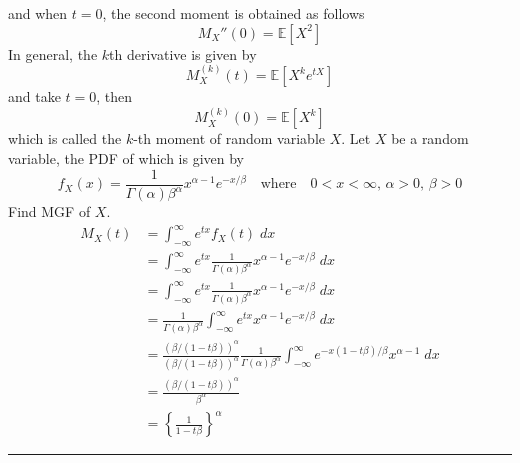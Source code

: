\documentclass[twoside]{article}
\makeatletter
\theoremstyle{definition}
\theoremstyle{remark}
\theoremstyle{remark}
\newenvironment{example}
 {\patchcmd{\@thm}{\trivlist}{\list{}{\leftmargin=3em \rightmargin=3em}}{}{}%
  \vspace*{10\p@}
  \innerexample\pushQED{\hfill\ensuremath{\Diamond}}}
 {\popQED\endinnerexample}
\newenvironment{sol}{{\bf Solution:}}{\hfill\rule{2mm}{2mm}}
\makeatother
\begin{document}
and when $t=0$, the second moment is obtained as follows
\begin{equation}
  M_X''(0) = \mathbb{E}[X^2]
\end{equation}
In general, the $k$th derivative is given by
\begin{equation}
  M_X^{(k)}(t) = \mathbb{E}[X^k{e^{tX}}]
\end{equation}
and take $t=0$, then
\begin{equation}
  M_X^{(k)}(0) = \mathbb{E}[X^k]
\end{equation}
which is called the $k$-th moment of random variable $X$.
\begin{example}
  Let $X$ be a random variable, the PDF of which is given by
  \begin{equation*}
    f_X(x) = \frac{1}{\Gamma(\alpha)\beta^{\alpha}} x^{\alpha-1}e^{-x/\beta}
    \quad \textrm{where} \quad 0 < x < \infty,\, \alpha>0,\, \beta>0
  \end{equation*}
  Find MGF of $X$. \\
  \begin{sol}
    \begin{equation*}
      \begin{split}
        M_X(t)
        &= \int_{-\infty}^{\infty} e^{tx} f_X(t) \;dx \\
        &= \int_{-\infty}^{\infty} e^{tx} \frac{1}{\Gamma(\alpha)\beta^{\alpha}} x^{\alpha-1}e^{-x/\beta} \;dx \\
        &= \int_{-\infty}^{\infty} e^{tx} \frac{1}{\Gamma(\alpha)\beta^{\alpha}} x^{\alpha-1}e^{-x/\beta} \;dx \\
        &= \frac{1}{\Gamma(\alpha)\beta^{\alpha}} \int_{-\infty}^{\infty} e^{tx} x^{\alpha-1}e^{-x/\beta} \;dx \\
        &= \frac{{(\beta/(1-t\beta))}^\alpha}{{(\beta/(1-t\beta))}^\alpha} \frac{1}{\Gamma(\alpha)\beta^{\alpha}} \int_{-\infty}^{\infty} e^{-x(1-t\beta)/\beta} x^{\alpha-1} \;dx \\
        &= \frac{{(\beta/(1-t\beta))}^\alpha}{\beta^\alpha} \\
        &= {\left\{\frac{1}{1-t\beta}\right\}}^\alpha
      \end{split}
    \end{equation*}
  \end{sol}

\end{example}
\end{document}
